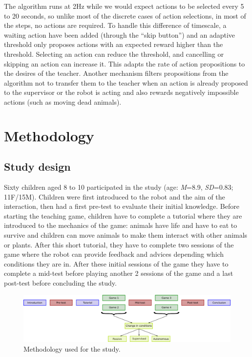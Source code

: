 The algorithm runs at 2Hz while we would expect actions to be selected every 5 to 20 seconds, so unlike most of the discrete cases of action selections, in most of the steps, no actions are required. To handle this difference of timescale, a waiting action have been added (through the ``skip button'') and an adaptive threshold only proposes actions with an expected reward higher than the threshold. Selecting an action can reduce the threshold, and cancelling or skipping an action can increase it. This adapts the rate of action propositions to the desires of the teacher. Another mechanism filters propositions from the algorithm not to transfer them to the teacher when an action is already proposed to the supervisor or the robot is acting and also rewards negatively impossible actions (such as moving dead animals).

\section{Methodology}

\subsection{Study design}

Sixty children aged 8 to 10 participated in the study (age: \textit{M}=8.9, \textit{SD}=0.83; 11F/15M).  Children were first introduced to the robot and the aim of the interaction, then had a first pre-test to evaluate their initial knowledge. Before starting the teaching game, children have to complete a tutorial where they are introduced to the mechanics of the game: animals have life and have to eat to survive and children can move animals to make them interact with other animals or plants. After this short tutorial, they have to complete two sessions of the game where the robot can provide feedback and advices depending which conditions they are in. After these initial sessions of the game they have to complete a mid-test before playing another 2 sessions of the game and a last post-test before concluding the study. 

\begin{figure}[h]
	\includegraphics[width=.9\linewidth]{graph.png}
	\centering
	\caption{Methodology used for the study.}
	\label{fig:method}
\end{figure}

